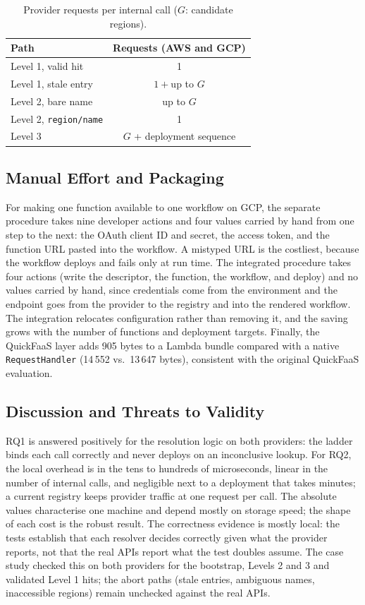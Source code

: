 \documentclass[conference]{IEEEtran}
\begin{document}
\begin{table}[t]
  \centering
  \caption{Provider requests per internal call ($G$: candidate regions).}
  \label{tab:api}
  \footnotesize
  \begin{tabular}{|l|c|}
    \hline
    \textbf{Path} & \textbf{Requests (AWS and GCP)} \\
    \hline
    Level 1, valid hit & 1 \\
    \hline
    Level 1, stale entry & $1 + {}$up to $G$ \\
    \hline
    Level 2, bare name & up to $G$ \\
    \hline
    Level 2, \texttt{region/name} & 1 \\
    \hline
    Level 3 & $G$ + deployment sequence \\
    \hline
  \end{tabular}
\end{table}

\subsection{Manual Effort and Packaging}
For making one function available to one workflow on GCP, the separate procedure takes nine
developer actions and four values carried by hand from one step to the next: the OAuth client ID
and secret, the access token, and the function URL pasted into the workflow. A mistyped URL is the
costliest, because the workflow deploys and fails only at run time. The integrated procedure takes
four actions (write the descriptor, the function, the workflow, and deploy) and no values carried
by hand, since credentials come from the environment and the endpoint goes from the provider to the
registry and into the rendered workflow. The integration relocates configuration rather than
removing it, and the saving grows with the number of functions and deployment targets. Finally,
the QuickFaaS layer adds 905 bytes to a Lambda bundle compared with a native
\texttt{RequestHandler} (14\,552 vs.\ 13\,647 bytes), consistent with the original QuickFaaS
evaluation.

\subsection{Discussion and Threats to Validity}
RQ1 is answered positively for the resolution logic on both providers: the ladder binds each call
correctly and never deploys on an inconclusive lookup. For RQ2, the local overhead is in the tens
to hundreds of microseconds, linear in the number of internal calls, and negligible next to a
deployment that takes minutes; a current registry keeps provider traffic at one request per call.
The absolute values characterise one machine and depend mostly on storage speed; the shape of each
cost is the robust result. The correctness evidence is mostly local: the tests establish that each
resolver decides correctly given what the provider reports, not that the real APIs report what the
test doubles assume. The case study checked this on both providers for the bootstrap, Levels 2
and 3 and validated Level 1 hits; the abort paths (stale entries, ambiguous names, inaccessible
regions) remain unchecked against the real APIs.
\end{document}
